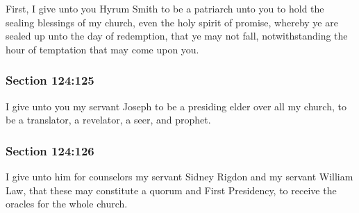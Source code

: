 		\begin{framed}
		\scriptsize
			\begin{compactdesc}
				\item[JSP] First, I give unto you Hyrum Smith to be a patriarch unto you to hold the sealing blessings of my church, even the holy spirit of promise, whereby ye are sealed up unto the day of redemption, that ye may not fall, notwithstanding the hour of temptation that may come upon you.
			\end{compactdesc}
		\end{framed}

	\subsubsection{Section 124:125} %
		\label{DC124-125}

		I give unto you my servant Joseph to be a presiding elder over all my church, to be a translator, a revelator, a seer, and prophet.


	\subsubsection{Section 124:126} %
		\label{DC124-126}

		I give unto him for counselors my servant Sidney Rigdon and my servant William Law, that these may constitute a quorum and First Presidency, to receive the oracles for the whole church.


